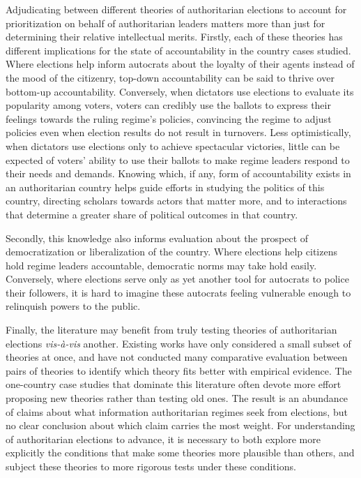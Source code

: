 \documentclass[12pt]{article}
\newcommand{\1}{\mathbbm{1}}
\begin{document}
Adjudicating between different theories of authoritarian elections to account for prioritization on behalf of authoritarian leaders matters more than just for determining their relative intellectual merits. Firstly, each of these theories has different implications for the state of accountability in the country cases studied. Where elections help inform autocrats about the loyalty of their agents instead of the mood of the citizenry, top-down accountability can be said to thrive over bottom-up accountability. Conversely, when dictators use elections to evaluate its popularity among voters, voters can credibly use the ballots to express their feelings towards the ruling regime's policies, convincing the regime to adjust policies even when election results do not result in turnovers. Less optimistically, when dictators use elections only to achieve spectacular victories, little can be expected of voters' ability to use their ballots to make regime leaders respond to their needs and demands. Knowing which, if any, form of accountability exists in an authoritarian country helps guide efforts in studying the politics of this country, directing scholars towards actors that matter more, and to interactions that determine a greater share of political outcomes in that country. 

Secondly, this knowledge also informs evaluation about the prospect of democratization or liberalization of the country. Where elections help citizens hold regime leaders accountable, democratic norms may take hold easily. Conversely, where elections serve only as yet another tool for autocrats to police their followers, it is hard to imagine these autocrats feeling vulnerable enough to relinquish powers to the public. 

Finally, the literature may benefit from truly testing theories of authoritarian elections \textit{vis-\`{a}-vis} another. Existing works have only considered a small subset of theories at once, and have not conducted many comparative evaluation between pairs of theories to identify which theory fits better with empirical evidence. The one-country case studies that dominate this literature \citep{LustOkar2005, Geddes2005, Magaloni2006, Blaydes2008} often devote more effort proposing new theories rather than testing old ones. The result is an abundance of claims about what information authoritarian regimes seek from elections, but no clear conclusion about which claim carries the most weight. For understanding of authoritarian elections to advance, it is necessary to both explore more explicitly the conditions that make some theories more plausible than others, and subject these theories to more rigorous tests under these conditions.
\end{document}
